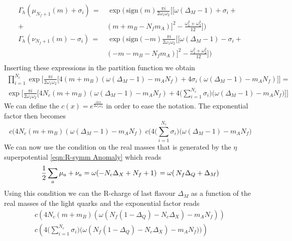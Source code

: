 \begin{equation}
\begin{aligned}
\Gamma_h (  \mu_{N_f+1}(m) + \sigma_i ) \, = &\, \exp \bigg( \, \mbox{sign}(m) \frac{\pi i}{2 \omega_1 \omega_2 } \big[ [ \omega (\Delta_M - 1) + \sigma_i + \\
+ & ( m + m_B - N_f m_A)]^2 - \frac{ \omega_1^2 + \omega_2^2 }{12} \big] \bigg )\\
\Gamma_h (  \nu_{N_f+1}(m) - \sigma_i  ) \, = &\, \exp \bigg( \, \mbox{sign}(-m) \frac{\pi i}{2 \omega_1 \omega_2 } \big[ [ \omega (\Delta_M - 1) - \sigma_i + \\
&( - m - m_B - N_f m_A)]^2 - \frac{ \omega_1^2 + \omega_2^2 }{12} \big] \bigg )\\
\end{aligned}
\end{equation}
Inserting these expressions in the partition function we obtain 
\begin{multline}
 \prod_{i=1}^{N_c} \exp \bigg[ \frac{\pi i}{2 \omega_1 \omega_2 } \bigg[ 4  ( m  + m_B ) ( \omega (\Delta_M - 1) -  m_A N_f ) +  4 \sigma_i  (\omega (\Delta_M - 1) -  m_A N_f)\bigg] \bigg] = \\
 \exp \bigg[ \frac{\pi i}{2 \omega_1 \omega_2 } \bigg[ 4 N_c  ( m  + m_B ) ( \omega (\Delta_M - 1) -  m_A N_f ) 
 +4\big( \sum_{i=1}^{N_c}  \sigma_i  \big) \big(\omega (\Delta_M - 1) -  m_A N_f \big)  \bigg] \bigg]
\end{multline}
We can define the $ c(x) = e^{ \frac{i \pi x }{2 \omega_1 \omega_2}}$ in order to ease the notation.
The exponential factor then becomes
\begin{equation}
c( 4 N_c  ( m  + m_B ) ( \omega (\Delta_M - 1) -  m_A N_f ) \;  c ( 4\big( \sum_{i=1}^{N_c}  \sigma_i  \big) \big (\omega (\Delta_M - 1) -  m_A N_f \big)
\end{equation}
We can now use the condition on the real masses that is generated by the $\eta$ superpotential \eqref{eqn:R-symm Anomaly} which reads
\begin{equation}
  { 1 \over 2 } \sum_a \mu_a + \nu_a  = \omega ( -N_c \Delta_X + N_f + 1 )  \, =\omega( \, N_f \Delta_Q +  \Delta_M )
\end{equation}
Using this condition we can the R-charge of last flavour $\Delta_M$ as a function of the real masses of the light quarks and the exponential factor reads
\begin{multline}
c \left( 4 N_c  ( m  + m_B ) ( \omega ( N_f (1 - \Delta_Q)  - N_c \Delta_X ) -  m_A N_f )\right)\,  \\
c\left( 4\big( \sum_{i=1}^{N_c}   \sigma_i  \big) \big ( \omega( N_f (1 - \Delta_Q)  - N_c \Delta_X)  -  m_A N_f ) \big) \right)
\end{multline}
